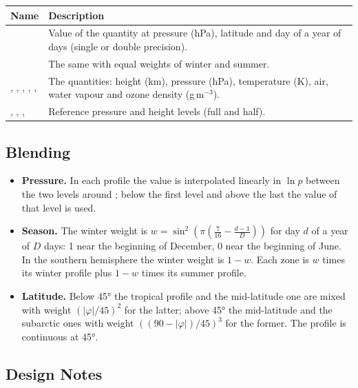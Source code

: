 \begin{longtable}{L{5.6cm} L{8.4cm}}
  \toprule
  \textbf{Name} & \textbf{Description} \\
  \midrule
  \endhead
  \bottomrule
  \endfoot
   &
    Value of the quantity  at pressure  (hPa),
    latitude  and day  of a year of  days
    (single or double precision). \\
   &
    The same with equal weights of winter and summer. \\
  , , , ,
  ,  &
    The quantities: height (km), pressure (hPa), temperature (K), air,
    water vapour and ozone density (g\,m$^{-3}$). \\
  , , ,  &
    Reference pressure and height levels (full and half). \\
\end{longtable}

\subsection{Blending}

\begin{itemize}
  \item \textbf{Pressure.} In each profile the value is interpolated
        linearly in $\ln p$ between the two levels around ; below
        the first level and above the last the value of that level is
        used.
  \item \textbf{Season.} The winter weight is
        $w = \sin^2\left(\pi\left(\tfrac{7}{16}-\tfrac{d-1}{D}\right)\right)$
        for day $d$ of a year of $D$ days: 1 near the beginning of December,
        0 near the beginning of June. In the southern hemisphere the
        winter weight is $1-w$. Each zone is $w$ times its winter profile
        plus $1-w$ times its summer profile.
  \item \textbf{Latitude.} Below 45° the tropical profile and the
        mid-latitude one are mixed with weight $(|\varphi|/45)^2$ for the
        latter; above 45° the mid-latitude and the subarctic ones with
        weight $((90-|\varphi|)/45)^3$ for the former. The profile is
        continuous at 45°.
\end{itemize}

\subsection{Design Notes}

